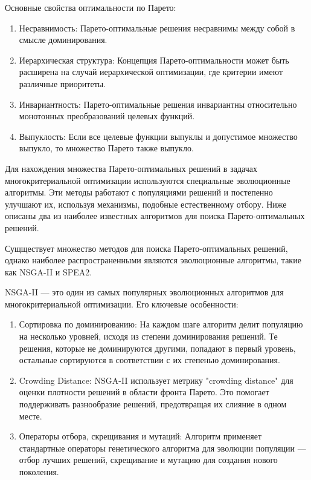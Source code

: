 Основные свойства оптимальности по Парето:
\begin{enumerate}
    \item Несравнимость: Парето-оптимальные решения несравнимы между собой в смысле доминирования.

    \item Иерархическая структура: Концепция Парето-оптимальности может быть расширена на случай иерархической оптимизации, где критерии имеют различные приоритеты.

    \item Инвариантность: Парето-оптимальные решения инвариантны относительно монотонных преобразований целевых функций.

    \item Выпуклость: Если все целевые функции выпуклы и допустимое множество выпукло, то множество Парето также выпукло.
\end{enumerate}

Для нахождения множества Парето-оптимальных решений в задачах многокритериальной оптимизации
используются специальные эволюционные алгоритмы. Эти методы работают с популяциями решений и
постепенно улучшают их, используя механизмы, подобные естественному отбору. Ниже описаны два из наиболее
известных алгоритмов для поиска Парето-оптимальных решений.

Сущществует множество методов для поиска Парето-оптимальных решений, однако наиболее
распространенными являются эволюционные алгоритмы, такие как NSGA-II и SPEA2.

NSGA-II — это один из самых популярных эволюционных алгоритмов для многокритериальной оптимизации. Его ключевые особенности:

\begin{enumerate}
    \item Сортировка по доминированию: На каждом шаге алгоритм делит популяцию на несколько уровней,
    исходя из степени доминирования решений. Те решения, которые не доминируются другими, попадают в
    первый уровень, остальные сортируются в соответствии с их степенью доминирования.

    \item Crowding Distance: NSGA-II использует метрику "crowding distance" для оценки плотности
    решений в области фронта Парето. Это помогает поддерживать разнообразие решений, предотвращая
    их слияние в одном месте.

    \item Операторы отбора, скрещивания и мутаций: Алгоритм применяет стандартные операторы
    генетического алгоритма для эволюции популяции — отбор лучших решений, скрещивание и мутацию
    для создания нового поколения.
\end{enumerate}

